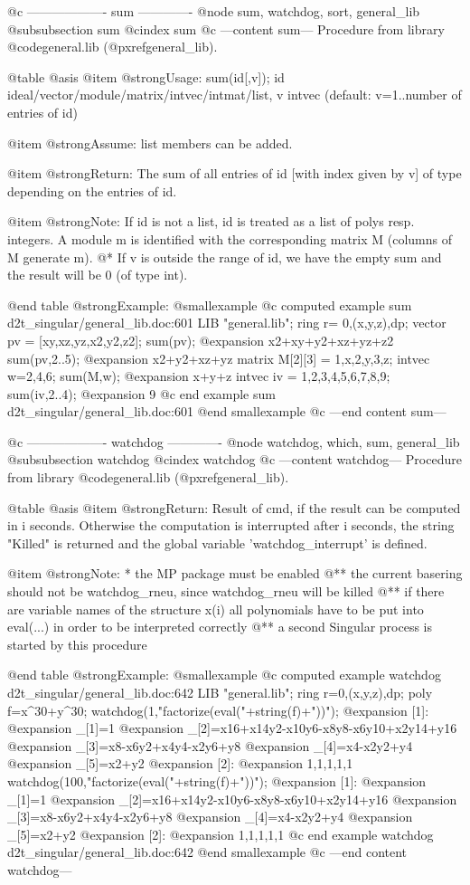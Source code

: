@c ------------------- sum -------------
@node sum, watchdog, sort, general_lib
@subsubsection sum
@cindex sum
@c ---content sum---
Procedure from library @code{general.lib} (@pxref{general_lib}).

@table @asis
@item @strong{Usage:}
sum(id[,v]); id ideal/vector/module/matrix/intvec/intmat/list,
v intvec (default: v=1..number of entries of id)

@item @strong{Assume:}
list members can be added.

@item @strong{Return:}
The sum of all entries of id [with index given by v] of type
depending on the entries of id.

@item @strong{Note:}
If id is not a list, id is treated as a list of polys resp. integers.
A module m is identified with the corresponding matrix M (columns
of M generate m).
@* If v is outside the range of id, we have the empty sum and the
result will be 0 (of type int).

@end table
@strong{Example:}
@smallexample
@c computed example sum d2t_singular/general_lib.doc:601 
LIB "general.lib";
ring r= 0,(x,y,z),dp;
vector pv = [xy,xz,yz,x2,y2,z2];
sum(pv);
@expansion{} x2+xy+y2+xz+yz+z2
sum(pv,2..5);
@expansion{} x2+y2+xz+yz
matrix M[2][3] = 1,x,2,y,3,z;
intvec w=2,4,6;
sum(M,w);
@expansion{} x+y+z
intvec iv = 1,2,3,4,5,6,7,8,9;
sum(iv,2..4);
@expansion{} 9
@c end example sum d2t_singular/general_lib.doc:601
@end smallexample
@c ---end content sum---

@c ------------------- watchdog -------------
@node watchdog, which, sum, general_lib
@subsubsection watchdog
@cindex watchdog
@c ---content watchdog---
Procedure from library @code{general.lib} (@pxref{general_lib}).

@table @asis
@item @strong{Return:}
Result of cmd, if the result can be computed in i seconds.
Otherwise the computation is interrupted after i seconds,
the string "Killed" is returned and the global variable
'watchdog_interrupt' is defined.

@item @strong{Note:}
* the MP package must be enabled
@** the current basering should not be watchdog_rneu, since
watchdog_rneu will be killed
@** if there are variable names of the structure x(i) all
polynomials have to be put into eval(...) in order to be
interpreted correctly
@** a second Singular process is started by this procedure

@end table
@strong{Example:}
@smallexample
@c computed example watchdog d2t_singular/general_lib.doc:642 
LIB "general.lib";
ring r=0,(x,y,z),dp;
poly f=x^30+y^30;
watchdog(1,"factorize(eval("+string(f)+"))");
@expansion{} [1]:
@expansion{}    _[1]=1
@expansion{}    _[2]=x16+x14y2-x10y6-x8y8-x6y10+x2y14+y16
@expansion{}    _[3]=x8-x6y2+x4y4-x2y6+y8
@expansion{}    _[4]=x4-x2y2+y4
@expansion{}    _[5]=x2+y2
@expansion{} [2]:
@expansion{}    1,1,1,1,1
watchdog(100,"factorize(eval("+string(f)+"))");
@expansion{} [1]:
@expansion{}    _[1]=1
@expansion{}    _[2]=x16+x14y2-x10y6-x8y8-x6y10+x2y14+y16
@expansion{}    _[3]=x8-x6y2+x4y4-x2y6+y8
@expansion{}    _[4]=x4-x2y2+y4
@expansion{}    _[5]=x2+y2
@expansion{} [2]:
@expansion{}    1,1,1,1,1
@c end example watchdog d2t_singular/general_lib.doc:642
@end smallexample
@c ---end content watchdog---

